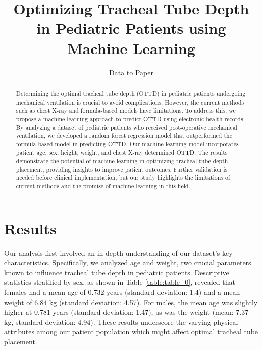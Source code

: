 \documentclass[11pt]{article}
\title{Optimizing Tracheal Tube Depth in Pediatric Patients using Machine Learning}
\author{Data to Paper}
\begin{document}
\maketitle
\begin{abstract}
Determining the optimal tracheal tube depth (OTTD) in pediatric patients undergoing mechanical ventilation is crucial to avoid complications. However, the current methods such as chest X-ray and formula-based models have limitations. To address this, we propose a machine learning approach to predict OTTD using electronic health records. By analyzing a dataset of pediatric patients who received post-operative mechanical ventilation, we developed a random forest regression model that outperformed the formula-based model in predicting OTTD. Our machine learning model incorporates patient age, sex, height, weight, and chest X-ray determined OTTD. The results demonstrate the potential of machine learning in optimizing tracheal tube depth placement, providing insights to improve patient outcomes. Further validation is needed before clinical implementation, but our study highlights the limitations of current methods and the promise of machine learning in this field.
\end{abstract}
\section*{Results}

Our analysis first involved an in-depth understanding of our dataset's key characteristics. Specifically, we analyzed age and weight, two crucial parameters known to influence tracheal tube depth in pediatric patients. Descriptive statistics stratified by sex, as shown in Table \ref{table:table_0}, revealed that females had a mean age of 0.732 years (standard deviation: 1.4) and a mean weight of 6.84 kg (standard deviation: 4.57). For males, the mean age was slightly higher at 0.781 years (standard deviation: 1.47), as was the weight (mean: 7.37 kg, standard deviation: 4.94). These results underscore the varying physical attributes among our patient population which might affect optimal tracheal tube placement. 
\end{document}
